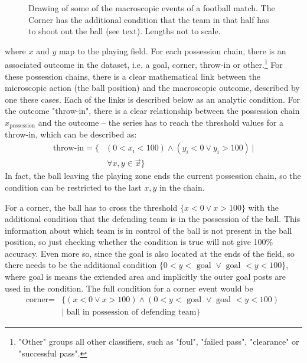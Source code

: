 \documentclass[10pt, a4paper]{UUThesisTemplate}
\begin{document}
\begin{figure}
\caption{Drawing of some of the macroscopic events of a football match. The Corner has the additional condition that the team in that half has to shoot out the ball (see text). Lengths not to scale.}\label{fig:conditiondrawing}
\end{figure}

where $x$ and $y$ map to the playing field. For each possession chain, there is an associated outcome in the dataset,  i.e. a goal, corner, throw-in or other.\footnote{"Other" groups all other classifiers, such as "foul", "failed pass", "clearance" or "successful pass".} For these possession chains, there is a clear mathematical link between the microscopic action (the ball position) and the macroscopic outcome, described by one these cases. Each of the links is described below as an analytic condition. For the outcome "throw-in", there is a clear relationship between the possession chain $x_\text{possession}$ and the outcome – the series has to reach the threshold values for a throw-in, which can be described as:
\begin{align}
\text{throw-in} = \{&(0 < x_i < 100) \wedge (y_i < 0 \vee y_i > 100)\,|\nonumber\\
&\, \forall x, y \in \vec{x}\}
\end{align}
In fact, the ball leaving the playing zone ends the current possession chain, so the condition can be restricted to the last $x,y$ in the chain.

For a corner, the ball has to cross the threshold $\{x < 0 \vee x>100\}$ with the additional condition that the defending team is in the possession of the ball. This information about which team is in control of the ball is not present in the ball position, so just checking whether the condition is true will not give 100\% accuracy. Even more so, since the goal is also located at the ends of the field, so there needs to be the additional condition $\{0 < y < \text{ goal } \vee \text{ goal } < y < 100\}$, where goal is means the extended area and implicitly the outer goal posts are used in the condition. The full condition for a corner event would be 
\begin{align}
\text{corner} =& \{(x < 0 \vee x > 100) \wedge (0 < y <\text{ goal } \vee \text{ goal } < y < 100)~\nonumber\\
&| \text{ ball in possession of defending team}\}
\end{align}
\end{document}
